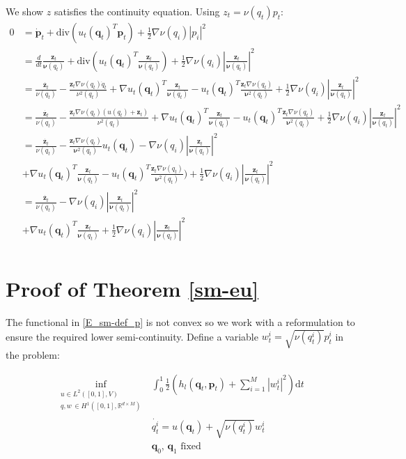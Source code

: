 \documentclass[runningheads]{llncs}
\newcommand{\half}{\frac 12}
\newcommand{\diff}[1]{\text{d} #1}
\newcommand{\RdM}{\mathbb{R}^{d\times M}}
\newcommand{\mdiv}{\text{div}}
\begin{document}
We show $z$ satisfies the continuity equation. Using $z_t = \nu(q_t)p_t$:
\begin{align*} 0 & = \dot{\mathbf p}_t + \mdiv(u_t(\mathbf q_t)^T \mathbf p_t) +
\frac12\nabla\nu(q_i) |p_i|^2\\
& = \frac{d}{dt}\frac{\mathbf z_t}{\mathbf \nu(q_t)} + \mdiv(u_t(\mathbf q_t)^T \frac{\mathbf z_t}{\mathbf \nu(q_t)}) 
    +  \frac12\nabla\nu(q_i) |\frac{\mathbf z_t}{\mathbf \nu(q_t)}|^2\\
& = \frac{\dot{\mathbf z_t}}{\nu(q_t)} - \frac{\mathbf z_t \nabla\nu(q_t)\dot{q}_t}{\nu^2(q_t)} + 
\nabla u_t(\mathbf q_t)^T \frac{\mathbf z_t}{\mathbf \nu(q_t)}
- u_t(\mathbf q_t)^T \frac{\mathbf z_t\nabla \nu(q_t)}{\mathbf \nu^2(q_t)}
    + \frac12\nabla\nu(q_i) |\frac{\mathbf z_t}{\mathbf \nu(q_t)}|^2\\
& = \frac{\dot{\mathbf z_t}}{\nu(q_t)} - \frac{\mathbf z_t \nabla\nu(q_t)(u(q_t)+ \mathbf z_t)}{\nu^2(q_t)} + 
\nabla u_t(\mathbf q_t)^T \frac{\mathbf z_t}{\mathbf \nu(q_t)}
- u_t(\mathbf q_t)^T \frac{\mathbf z_t\nabla \nu(q_t)}{\mathbf \nu^2(q_t)}
    + \frac12\nabla\nu(q_i) |\frac{\mathbf z_t}{\mathbf \nu(q_t)}|^2\\
& = \frac{\dot{\mathbf z_t}}{\nu(q_t)} - \frac{\mathbf z_t\nabla \nu(q_t)}{\mathbf \nu^2(q_t)}u_t(\mathbf q_t)
 - \nabla\nu(q_i) |\frac{\mathbf z_t}{\mathbf \nu(q_t)}|^2\\
&+  \nabla u_t(\mathbf q_t)^T \frac{\mathbf z_t}{\mathbf \nu(q_t)}
- u_t(\mathbf q_t)^T \frac{\mathbf z_t\nabla \nu(q_t)}{\mathbf \nu^2(q_t)})
    + \frac12\nabla\nu(q_i) |\frac{\mathbf z_t}{\mathbf \nu(q_t)}|^2\\
& = \frac{\dot{\mathbf z_t}}{\nu(q_t)}
 - \nabla\nu(q_i) |\frac{\mathbf z_t}{\mathbf \nu(q_t)}|^2\\
& + \nabla u_t(\mathbf q_t)^T \frac{\mathbf z_t}{\mathbf \nu(q_t)} + \frac12\nabla\nu(q_i) |\frac{\mathbf z_t}{\mathbf \nu(q_t)}|^2\\
\end{align*}


\section{Proof of Theorem \ref{sm-eu}}\label{app:proof:sm-eu}
The functional in \eqref{E_sm-def_p} is not convex so we work with a
reformulation to ensure the required lower semi-continuity. Define a
variable $w^i_t = \sqrt{\nu(q_t^i)} p^i_t$ in the problem:

\begin{align}
\inf_{\substack{u \in L^2([0,1],V)\\ q, w\, \in H^1([0,1],\RdM)}}
    & \int_0^1\half\left (h_l(\mathbf q_t,\mathbf p_t)  +\sum_{i=1}^M |w_t^i|^2\right )\diff{t}\\
    & \dot{q_t^i} = u(\mathbf q_t) + \sqrt{\nu(q_t^i)} w^i_t\\
    & \mathbf q_0,\,\mathbf q_1\text{ fixed}
  \label{pbl:reformulation}
\end{align}
\end{document}
